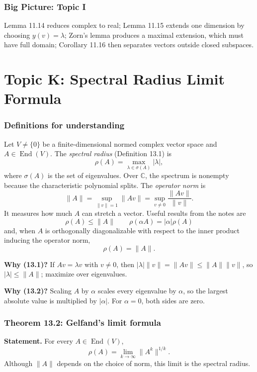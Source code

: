 \documentclass[11pt,a4paper]{article}
\begin{document}
\section*{Big Picture: Topic I}
Lemma 11.14 reduces complex to real; Lemma 11.15 extends one dimension by choosing \(y(v)=\lambda\); Zorn's lemma produces a maximal extension, which must have full domain; Corollary 11.16 then separates vectors outside closed subspaces.


\clearpage
\part*{Topic K: Spectral Radius Limit Formula}

\section*{Definitions for understanding}
Let \(V\neq\{0\}\) be a finite-dimensional normed complex vector space and \(A\in\operatorname{End}(V)\).
The \emph{spectral radius} (Definition 13.1) is
\[
 \boxed{\rho(A)=\max_{\lambda\in\sigma(A)}|\lambda|,}
\]
where \(\sigma(A)\) is the set of eigenvalues. Over \(\mathbb C\), the spectrum is nonempty because the characteristic polynomial splits.
The \emph{operator norm} is
\[
 \|A\|=\sup_{\|v\|=1}\|Av\|=\sup_{v\neq0}\frac{\|Av\|}{\|v\|}.
\]
It measures how much \(A\) can stretch a vector.
Useful results from the notes are
\[
 \rho(A)\leq\|A\|\tag{13.1}
 \qquad \rho(\alpha A)=|\alpha|\rho(A)\tag{13.2}
\]
and, when \(A\) is orthogonally diagonalizable with respect to the inner product inducing the operator norm,
\[
 \rho(A)=\|A\|.\tag{13.3}
\]
\begin{personalnote}
\textbf{Why (13.1)?} If \(Av=\lambda v\) with \(v\neq0\), then
\(|\lambda|\|v\|=\|Av\|\leq\|A\|\|v\|\), so \(|\lambda|\leq\|A\|\); maximize over eigenvalues.

\textbf{Why (13.2)?} Scaling \(A\) by \(\alpha\) scales every eigenvalue by \(\alpha\), so the largest absolute value is multiplied by \(|\alpha|\). For \(\alpha=0\), both sides are zero.
\end{personalnote}

\section{Theorem 13.2: Gelfand's limit formula}
\textbf{Statement.} For every \(A\in\operatorname{End}(V)\),
\[
 \boxed{\rho(A)=\lim_{k\to\infty}\|A^k\|^{1/k}.}
\]
Although \(\|A\|\) depends on the choice of norm, this limit is the spectral radius.
\end{document}
